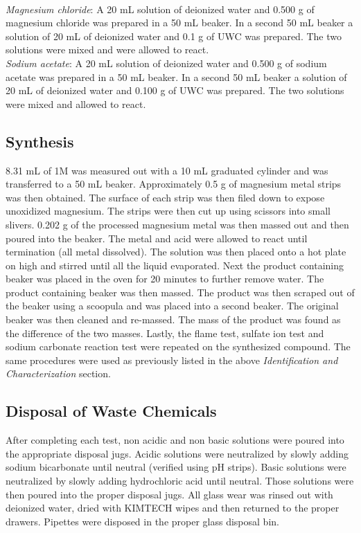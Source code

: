 \documentclass[12pt]{article}
\begin{document}
\vspace{6pt}\\\textit{Magnesium chloride}: A 20 mL solution of deionized water and 0.500 g of magnesium chloride was prepared in a 50 mL beaker. In a second 50 mL beaker a solution of 20 mL of deionized water and 0.1 g of UWC was prepared. The two solutions were mixed and were allowed to react.
\vspace{6pt}\\\textit{Sodium acetate}: A 20 mL solution of deionized water and 0.500 g of sodium acetate was prepared in a 50 mL beaker. In a second 50 mL beaker a solution of 20 mL of deionized water and 0.100 g of UWC was prepared. The two solutions were mixed and allowed to react.
\subsection{Synthesis}
8.31 mL of 1M  was measured out with a 10 mL graduated cylinder and was transferred to a 50 mL beaker. Approximately 0.5 g of magnesium metal strips was then obtained. The surface of each strip was then filed down to expose unoxidized magnesium. The strips were then cut up using scissors into small slivers. 0.202 g of the processed magnesium metal was then massed out and then poured into the beaker. The metal and acid were allowed to react until termination (all metal dissolved). The solution was then placed onto a hot plate on high and stirred until all the liquid evaporated. Next the product containing beaker was placed in the oven for 20 minutes to further remove water. The product containing beaker was then massed. The product was then scraped out of the beaker using a scoopula and was placed into a second beaker. The original beaker was then cleaned and re-massed. The mass of the product was found as the difference of the two masses. Lastly, the flame test, sulfate ion test and sodium carbonate reaction test were repeated on the synthesized compound. The same procedures were used as previously listed in the above \textit{Identification and Characterization} section.

\subsection{Disposal of Waste Chemicals}
After completing each test, non acidic and non basic solutions were poured into the appropriate disposal jugs. Acidic solutions were neutralized by slowly adding sodium bicarbonate until neutral (verified using pH strips). Basic solutions were neutralized by slowly adding hydrochloric acid until neutral. Those solutions were then poured into the proper disposal jugs. All glass wear was rinsed out with deionized water, dried with KIMTECH wipes and then returned to the proper drawers. Pipettes were disposed in the proper glass disposal bin.
\pagebreak
\end{document}
